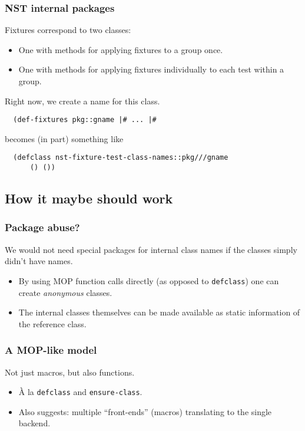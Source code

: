 \documentclass{beamer}
\begin{document}
\begin{frame}[fragile]
  \frametitle{NST internal packages}

  Fixtures correspond to two classes:
  \begin{itemize}
  \item One with methods for applying fixtures to a group once.
  \item One with methods for applying fixtures individually to each
    test within a group.
  \end{itemize}  
  Right now, we create a name for this class.
  {\small\begin{verbatim}
  (def-fixtures pkg::gname |# ... |# 
\end{verbatim}}
  becomes (in part) something like
  {\small\begin{verbatim}
  (defclass nst-fixture-test-class-names::pkg///gname
      () ())
\end{verbatim}}
\end{frame}

\subsection{How it maybe should work}

\begin{frame}
  \frametitle{Package abuse?}

  We would not need special packages for internal class names if the
  classes simply didn't have names.
  \begin{itemize}
  \item By using MOP function calls directly (as opposed to
    \texttt{defclass}) one can create \emph{anonymous} classes.
  \item The internal classes themselves can be made available as
    static information of the reference class.
  \end{itemize}  
  
\end{frame}

\begin{frame}
  \frametitle{A MOP-like model}
  
  Not just macros, but also functions.
  \begin{itemize}
  \item \`A la \texttt{defclass} and \texttt{ensure-class}.
  \item Also suggests: multiple ``front-ends'' (macros) translating to
    the single backend.
  \end{itemize}
\end{frame}
\end{document}
